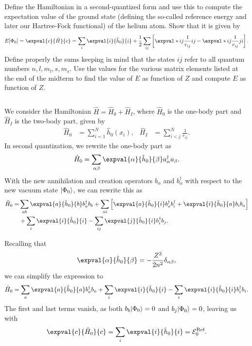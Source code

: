 Define the Hamiltonian in a second-quantized form and use this to compute the expectation value of the ground state (defining the so-called reference energy and later our Hartree-Fock functional) of
the helium atom.
Show that it is given by
\begin{equation}
    E[\Phi_0] = \expval{c}{\hat{H}}{c} = \sum_{i} \expval{i}{\hat{h}_0}{i} + \frac{1}{2} \sum_{ij} \left[\expval*{ij}{\frac{1}{r_{ij}}}{ij} - \expval*{ij}{\frac{1}{r_{ij}}}{ji}\right].
\end{equation}
Define properly the sums keeping in mind that the states $ij$ refer to all quantum numbers $n, l, m_l, s, m_s$.
Use the values for the various matrix elements listed at the end of the midterm to find the value of $E$ as function of $Z$ and compute $E$ as function of $Z$.

\subsection{}
We consider the Hamiltonian $\hat{H} = \hat{H}_0 + \hat{H}_I$, where $\hat{H}_0$ is the one-body part and $\hat{H}_I$ is the two-body part, given by
\begin{align*}
    \hat{H}_0 &= \sum_{i=1}^{N}\hat{h}_0(x_i), &
    \hat{H}_I &= \sum_{i<j}^{N}\frac{1}{r_{ij}}.
\end{align*}
In second quantization, we rewrite the one-body part as
\begin{equation}
    \hat{H}_0 = \sum_{\alpha\beta} \expval{\alpha}{\hat{h}_0}{\beta} a_\alpha^\dagger a_\beta.
\end{equation}
With the new annihilation and creation operators $b_\alpha$ and $b_\alpha^\dagger$ with respect to the new vacuum state $\ket*{\Phi_0}$, we can rewrite this as
\begin{equation}\label{eq:H0_second_quant}
    \begin{split}
        \hat{H}_0 =& \sum_{ab} \expval{a}{\hat{h}_0}{b} b_a^\dagger b_b + \sum_{ai} \left[ \expval{a}{\hat{h}_0}{i} b_a^\dagger b_i^\dagger + \expval{i}{\hat{h}_0}{a} b_i b_a \right] \\
        &+ \sum_{i} \expval{i}{\hat{h}_0}{i} - \sum_{ij} \expval{j}{\hat{h}_0}{i} b_i^\dagger b_j.
    \end{split}
\end{equation}

Recalling that
\begin{equation*}
    \expval{\alpha}{\hat{h}_0}{\beta} = -\frac{Z^2}{2n^2}\delta_{\alpha \beta},
\end{equation*}
we can simplify the expression to
\begin{equation*}
    \hat{H}_0 = \sum_{a} \expval{a}{\hat{h}_0}{a} b_a^\dagger b_a + \sum_{i} \expval{i}{\hat{h}_0}{i} - \sum_{i} \expval{i}{\hat{h}_0}{i} b_i^\dagger b_i.
\end{equation*}
The first and last terms vanish, as both $b_b \ket*{\Phi_0} = 0$ and $b_j \ket*{\Phi_0} = 0$, leaving us with
\begin{equation}
    \expval{c}{\hat{H}_0}{c} = \sum_{i} \expval{i}{\hat{h}_0}{i} = \mathcal{E}_0^{\text{Ref}}.
\end{equation}

